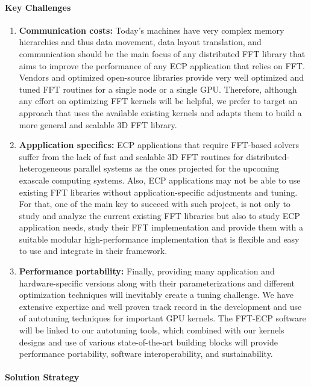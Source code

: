 \paragraph{Key  Challenges}
\begin{enumerate}
\item
\textbf{Communication costs:}
Today’s machines have very complex memory hierarchies and thus data movement, 
data layout translation, and communication should be the main focus of any 
distributed FFT library that aims to improve the performance of any ECP 
application that relies on FFT. Vendors and optimized open-source libraries 
provide very well optimized and tuned FFT routines for a single node or a 
single GPU. Therefore, although any effort on optimizing FFT kernels will 
be helpful, we prefer to target an approach that uses the available existing 
kernels and adapts them to build a more general and scalable 3D FFT library.

\item
\textbf{Appplication specifics:}
ECP applications that require FFT-based solvers suffer from the lack of fast 
and scalable 3D FFT routines for distributed-heterogeneous parallel systems 
as the ones projected for the upcoming exascale computing systems. Also, ECP 
applications may not be able to use existing FFT libraries without 
application-specific adjustments and tuning. For that, one of the main key to 
succeed with such project, is not only to study and analyze the current 
existing FFT libraries but also to study ECP application needs, study their 
FFT implementation and provide them with a suitable modular high-performance 
implementation that is flexible and easy to use and integrate in their framework.

\item
\textbf{Performance portability:}
Finally, providing many application and hardware-specific versions along with 
their parameterizations and different optimization techniques will inevitably 
create a tuning challenge. We have extensive expertize and well proven track 
record in the development and use of autotuning techniques for important GPU 
kernels. The FFT-ECP software will be linked to our autotuning tools, which 
combined with our kernels designs and use of various state-of-the-art building 
blocks will provide performance portability, software interoperability, and sustainability.
\end{enumerate}

\paragraph{Solution Strategy}


